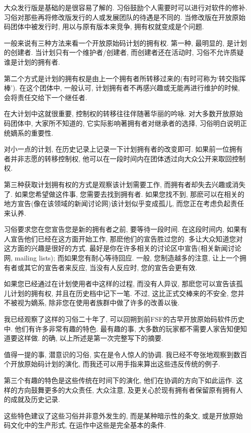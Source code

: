 \documentclass[a4paper,12pt,UTF8,twoside]{ctexbook}
\begin{document}
大众发行版是基础的是很容易了解的. 习俗鼓励个人需要时可以进行对软件的修补. 习俗对那些再将修改版发行的人或发展团队的待遇是不同的. 当修改版在开放原始码团体中被发行时, 用以与原有版本来竞争, 拥有权就变成是个问题.

一般来说有三种方法来看一个开放原始码计划的拥有权. 第一种, 最明显的, 是计划的创建者. 当计划只有一个维护者/创建者, 而创建者还在活动时, 习俗不允许质疑谁是计划的拥有者.

第二个方式是计划的拥有权是由上一个拥有者所转移过来的(有时可称为`转交指挥棒'). 在这个团体中, 一般认可, 计划拥有者不再感兴趣或无能再进行维护的时候, 会将责任交给下一个继任者.

在大计划中这就很重要, 控制权的转移往往伴随著华丽的吟咏. 对大多数开放原始码团体中, 大家所不知道的, 它实际影响著拥有者对继承者的选择, 习俗明白说明正统嫡系的重要性.

对小一点的计划, 在历史记录上记录一下计划拥有者的改变即可. 如果前一位拥有者并非志愿的转移控制权, 他可以在一段时间内在团体透过向大众公开来取回控制权.

第三种获取计划拥有权的方式是观察该计划需要工作, 而拥有者却失去兴趣或消失了. 如果您希望做这件事, 您需要去找到拥有者. 如果您找不到, 那麽可以在相关的地方宣告(像在该领域的新闻讨论网)该计划似乎变成孤儿, 而您正在考虑负起责任来认养.

习俗要求您在您宣告您是新的拥有者之前, 要等待一段时间. 在这段时间内, 如果有人宣告他们已经在这方面开始工作, 那麽他们的宣告胜过您的. 多让大众知道您对这方面的兴趣是很好的方式. 最好是你在许多相关的讨论区中宣告(相关新闻讨论网, mailing lists); 而如果您有耐心等待回应. 一般, 您制造越多的注意, 让上一个拥有者或其它的宣告者来反应, 当没有人反应时, 您的宣告会更有效.

如果您已经通过在计划使用者中这样的过程, 而没有人异议, 那麽您可以宣告该孤儿计划的拥有权, 并且在历史档中记下一笔. 不过, 这比正式交棒来的不安全, 您并不被视为嫡系, 除非您在使用者族群中做了许多的改善以後.

我已经观察了这样的习俗二十年了, 可以回朔到前FSF的古早开放原始码软件历史中. 他们有许多非常有趣的特色. 最有趣的事,  大多数的玩家都不需要人家告知便知道要这样做. 的确, 以上所述是第一次完整写下的摘要.

值得一提的事, 潜意识的习俗, 实在是令人惊人的协调. 我已经不夸张地观察到数百个开放原始码计划的演化, 而我还可以用手指来算出这些违反传统的例子.

第三个有趣的特色是这些传统在时间下的演化, 他们在协调的方向下如此运作. 这样的方向鼓舞更多的大众责任, 大众注意, 及更关心於现有拥有者保留原有拥有人的成就及历史记录.

这些特色建议了这些习俗并非意外发生的, 而是某种暗示性的条文, 或是开放原始码文化中的生产形式, 在运作中这些是完全基本的条件.
\end{document}
